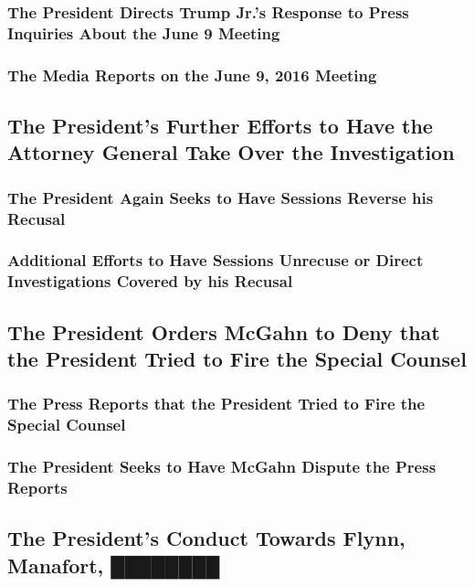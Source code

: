 \subsubsection{The President Directs Trump Jr.’s Response to Press Inquiries About the June 9 Meeting}

\subsubsection{The Media Reports on the June 9, 2016 Meeting}

\subsection{The President’s Further Efforts to Have the Attorney General Take Over the Investigation}

\subsubsection{The President Again Seeks to Have Sessions Reverse his Recusal}

\subsubsection{Additional Efforts to Have Sessions Unrecuse or Direct Investigations Covered by his Recusal}

\subsection{The President Orders McGahn to Deny that the President Tried to Fire the Special Counsel}

\subsubsection{The Press Reports that the President Tried to Fire the Special Counsel}

\subsubsection{The President Seeks to Have McGahn Dispute the Press Reports}

\subsection{The President’s Conduct Towards Flynn, Manafort, ████████}

